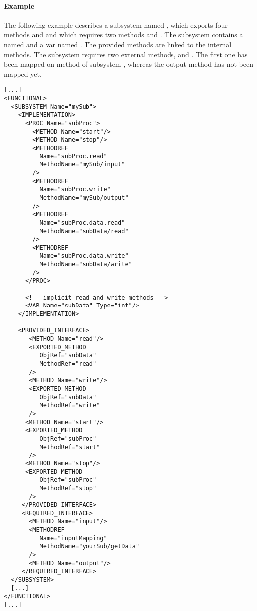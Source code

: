 \paragraph{Example}

The following example describes a subsystem named , which
exports four methods   and
 and which requires two methods  and
.  The subsystem contains a  named
 and a var named . The provided methods
are linked to the internal methods. The subsystem requires two
external methods,  and . The first one has
been mapped on method  of subsystem ,
whereas the output method has not been mapped yet.\textcolor{red}{}%


\begin{lstlisting}
[...]
<FUNCTIONAL>
  <SUBSYSTEM Name="mySub">
    <IMPLEMENTATION>
      <PROC Name="subProc">
        <METHOD Name="start"/>
        <METHOD Name="stop"/>
        <METHODREF
          Name="subProc.read"
          MethodName="mySub/input"
        />
        <METHODREF
          Name="subProc.write"
          MethodName="mySub/output"
        />
        <METHODREF
          Name="subProc.data.read"
          MethodName="subData/read"
        />
        <METHODREF
          Name="subProc.data.write"
          MethodName="subData/write"
        />
      </PROC>

      <!-- implicit read and write methods -->
      <VAR Name="subData" Type="int"/>
    </IMPLEMENTATION>

    <PROVIDED_INTERFACE>
       <METHOD Name="read"/>
       <EXPORTED_METHOD
          ObjRef="subData"
          MethodRef="read"
       />
       <METHOD Name="write"/>
       <EXPORTED_METHOD
          ObjRef="subData"
          MethodRef="write"
       />
      <METHOD Name="start"/>
      <EXPORTED_METHOD
          ObjRef="subProc"
          MethodRef="start"
       />
      <METHOD Name="stop"/>
      <EXPORTED_METHOD
          ObjRef="subProc"
          MethodRef="stop"
       />
     </PROVIDED_INTERFACE>
     <REQUIRED_INTERFACE>
       <METHOD Name="input"/>
       <METHODREF 
          Name="inputMapping"
          MethodName="yourSub/getData"
       />
       <METHOD Name="output"/>
     </REQUIRED_INTERFACE>
  </SUBSYSTEM>
  [...]
</FUNCTIONAL>
[...]
\end{lstlisting}


